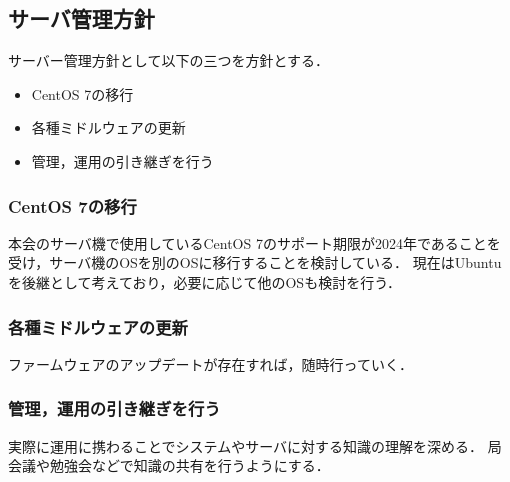 \subsection*{サーバ管理方針}


サーバー管理方針として以下の三つを方針とする．
\begin{itemize}
  \item CentOS 7の移行
  \item 各種ミドルウェアの更新
  \item 管理，運用の引き継ぎを行う
\end{itemize}

\subsubsection*{CentOS 7の移行}
本会のサーバ機で使用しているCentOS 7のサポート期限が2024年であることを受け，サーバ機のOSを別のOSに移行することを検討している．
現在はUbuntuを後継として考えており，必要に応じて他のOSも検討を行う．


\subsubsection*{各種ミドルウェアの更新}
ファームウェアのアップデートが存在すれば，随時行っていく．

\subsubsection*{管理，運用の引き継ぎを行う}
実際に運用に携わることでシステムやサーバに対する知識の理解を深める．
局会議や勉強会などで知識の共有を行うようにする．
